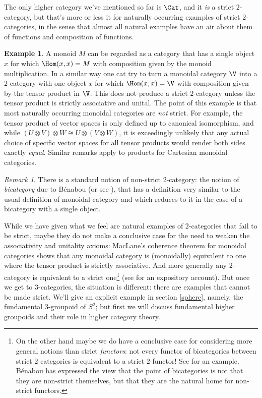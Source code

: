 \documentclass{conm-p-l}
\theoremstyle{definition} \newtheorem{definition}[theorem]{Definition}
\newtheorem{example}[theorem]{Example}
\theoremstyle{remark} \newtheorem{remark}[theorem]{Remark}
\numberwithin{equation}{section}
\begin{document}
The only higher category we've mentioned so far is $\Cat$, and it
\emph{is} a strict $2$-category, but that's more or less it for
naturally occurring examples of strict $2$-categories, in the sense
that almost all natural examples have an air about them of functions
and composition of functions.

\begin{example} A monoid $M$ can be regarded as a category that has a
single object $x$ for which $\Hom(x,x) = M$ with composition given by
the monoid multiplication. In a similar way one cat try to turn a
monoidal category $\V$ into a $2$-category with one object $x$ for
which $\Hom(x,x) = \V$ with composition given by the tensor product in
$\V$. This does not produce a strict $2$-category unless the tensor
product is strictly associative and unital. The point of this example
is that most naturally occurring monoidal categories are \emph{not}
strict. For example, the tensor product of vector spaces is only
defined up to canonical isomorphism, and while $(U \otimes V) \otimes
W \cong U \otimes (V \otimes W)$, it is exceedingly unlikely that any
actual choice of specific vector spaces for all tensor products would
render both sides exactly \emph{equal}. Similar remarks apply to
products for Cartesian monoidal categories. \end{example}

\begin{remark} There is a standard notion of non-strict $2$-category: the
notion of \emph{bicategory} due to B\'{e}nabou \cite{Benabou} (or see
\cite{Lack}), that has a definition very similar to the usual
definition of monoidal category and which reduces to it in the case of
a bicategory with a single object. \end{remark}

While we have given what we feel are natural examples of
$2$-categories that fail to be strict, maybe they do not make a
conclusive case for the need to weaken the associativity and unitality
axioms: MacLane's coherence theorem for monoidal categories shows
that any monoidal category is (monoidally) equivalent to one where the
tensor product is strictly associative. And more generally
any $2$-category is equivalent to a strict one\footnote{On the
other hand maybe we do have a conclusive case for considering more
general notions than strict \emph{functors}: not every functor of
bicategories between strict $2$-categories is equivalent to a strict
$2$-functor! See \cite[Lemma 2]{LackTri} for an example. B\'{e}nabou
has expressed the view that the point of bicategories is not that they
are non-strict themselves, but that they are the natural home for
non-strict functors.} (see \cite{LeinsterBicat} for an expository account).
But once we get to $3$-categories, the situation is different: there are
examples that cannot be made strict. We'll give an explicit example in
section \ref{sphere}, namely, the fundamental $3$-groupoid of $S^2$;
but first we will discuss fundamental higher groupoids and their role
in higher category theory.
\end{document}
